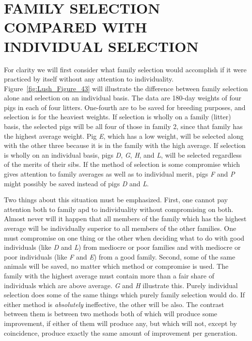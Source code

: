 \section*{FAMILY SELECTION COMPARED WITH INDIVIDUAL SELECTION}

For clarity we will first consider what family selection would accomplish
if it were practiced by itself without any attention to individuality.
Figure~\ref{fig:Lush_Figure_43} will illustrate the difference between family selection
alone and selection on an individual basis. The data are 180-day weights
of four pigs in each of four litters. One-fourth are to be saved for breeding
purposes, and selection is for the heaviest weights. If selection is
wholly on a family (litter) basis, the selected pigs will be all four of
those in family 2, since that family has the highest average weight. Pig
\textit{E}, which has a low weight, will be selected along with the other three
because it is in the family with the high average. If selection is wholly
on an individual basis, pigs \textit{D}, \textit{G}, \textit{H}, and \textit{L},
will be selected regardless
of the merits of their sibs. If the method of selection is some compromise
which gives attention to family averages as well as to individual
merit, pigs \textit{F} and \textit{P} might possibly be saved instead of
pigs \textit{D} and \textit{L}.

Two things about this situation must be emphasized. First, one cannot
pay attention both to family apd to individuality without compromising
on both. Almost never will it happen that all members of the
family which has the highest average will be individually superior to all
members of the other families. One must compromise on one thing or
the other when deciding what to do with good individuals (like \textit{D} and
\textit{L}) from mediocre or poor families and with mediocre or poor individuals
(like \textit{F} and \textit{E}) from a good family. Second, some of the same animals
will be saved, no matter which method or compromise is used. The family
with the highest average must contain more than a fair share of individuals
which are above average. \textit{G} and \textit{H} illustrate this. Purely
individual selection does some of the same things which purely family
selection would do. If either method is \textit{absolutely} ineffective, the other
will be also. The contrast between them is between two methods both of
which will produce some improvement, if either of them will produce
any, but which will not, except by coincidence, produce exactly the
same amount of improvement per generation.

